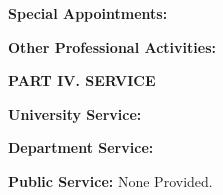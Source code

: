 \documentclass[10pt]{article}
\begin{document}
\vspace{0.25cm}
\textbf{Special Appointments:}
\vspace{0.15cm}



\vspace{0.2cm}
\textbf{Other Professional Activities:}
\vspace{0.15cm}




\vspace{0.25cm}
\textbf{PART IV.  SERVICE}

\vspace{0.5cm}
\textbf{University Service:}
\vspace{0.2cm}


\vspace{0.25cm}
\textbf{Department Service:}
\vspace{0.2cm}


\vspace{1.25cm}
\textbf{Public Service:}
\vspace{0.2cm}
None Provided.
\end{document}
